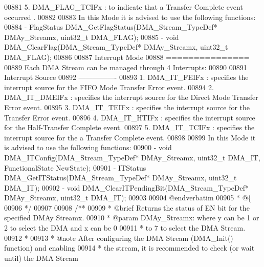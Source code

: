 \begin{DoxyCode}
00881 \textcolor{comment}{       5. DMA\_FLAG\_TCIFx  : to indicate that a Transfer Complete event occurred .       }
00882 \textcolor{comment}{}
00883 \textcolor{comment}{   In this Mode it is advised to use the following functions:}
00884 \textcolor{comment}{      - FlagStatus DMA\_GetFlagStatus(DMA\_Stream\_TypeDef* DMAy\_Streamx, uint32\_t DMA\_FLAG);}
00885 \textcolor{comment}{      - void DMA\_ClearFlag(DMA\_Stream\_TypeDef* DMAy\_Streamx, uint32\_t DMA\_FLAG);}
00886 \textcolor{comment}{}
00887 \textcolor{comment}{  Interrupt Mode}
00888 \textcolor{comment}{  ===============}
00889 \textcolor{comment}{    Each DMA Stream can be managed through 4 Interrupts:}
00890 \textcolor{comment}{}
00891 \textcolor{comment}{    Interrupt Source}
00892 \textcolor{comment}{    ----------------}
00893 \textcolor{comment}{       1. DMA\_IT\_FEIFx  : specifies the interrupt source for the  FIFO Mode Transfer Error event.}
00894 \textcolor{comment}{       2. DMA\_IT\_DMEIFx : specifies the interrupt source for the Direct Mode Transfer Error event.}
00895 \textcolor{comment}{       3. DMA\_IT\_TEIFx  : specifies the interrupt source for the Transfer Error event.}
00896 \textcolor{comment}{       4. DMA\_IT\_HTIFx  : specifies the interrupt source for the Half-Transfer Complete event.}
00897 \textcolor{comment}{       5. DMA\_IT\_TCIFx  : specifies the interrupt source for the a Transfer Complete event. }
00898 \textcolor{comment}{     }
00899 \textcolor{comment}{  In this Mode it is advised to use the following functions:}
00900 \textcolor{comment}{     - void DMA\_ITConfig(DMA\_Stream\_TypeDef* DMAy\_Streamx, uint32\_t DMA\_IT, FunctionalState NewState);}
00901 \textcolor{comment}{     - ITStatus DMA\_GetITStatus(DMA\_Stream\_TypeDef* DMAy\_Streamx, uint32\_t DMA\_IT);}
00902 \textcolor{comment}{     - void DMA\_ClearITPendingBit(DMA\_Stream\_TypeDef* DMAy\_Streamx, uint32\_t DMA\_IT);}
00903 \textcolor{comment}{}
00904 \textcolor{comment}{@endverbatim}
00905 \textcolor{comment}{  * @\{}
00906 \textcolor{comment}{  */}
00907 
00908 \textcolor{comment}{/**}
00909 \textcolor{comment}{  * @brief  Returns the status of EN bit for the specified DMAy Streamx.}
00910 \textcolor{comment}{  * @param  DMAy\_Streamx: where y can be 1 or 2 to select the DMA and x can be 0}
00911 \textcolor{comment}{  *          to 7 to select the DMA Stream.}
00912 \textcolor{comment}{  *   }
00913 \textcolor{comment}{  * @note    After configuring the DMA Stream (DMA\_Init() function) and enabling}
00914 \textcolor{comment}{  *          the stream, it is recommended to check (or wait until) the DMA Stream}

\end{DoxyCode}
